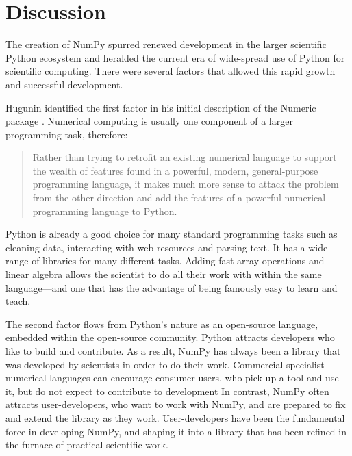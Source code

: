 \section*{Discussion}



The creation of NumPy spurred renewed development in the larger scientific
Python ecosystem and heralded the current era of wide-spread use of Python for
scientific computing.
There were several factors that allowed this rapid growth
and successful development.

Hugunin identified the first factor in his initial description of the Numeric
package \cite{Hugunin-whitepaper}.  Numerical computing is usually one
component of a larger programming task, therefore:
\begin{quote}
    Rather than trying to retrofit an existing numerical language to support
    the wealth of features found in a powerful, modern, general-purpose
    programming language, it makes much more sense to attack the problem from
    the other direction and add the features of a powerful numerical
    programming language to Python.
\end{quote}
Python is already a good choice for many standard programming tasks such as
cleaning data, interacting with web resources and parsing text.  It has a wide
range of libraries for many different tasks. Adding fast array operations and
linear algebra allows the scientist to do all their work with within the same
language---and one that has the advantage of being famously easy to learn and
teach.

The second factor flows from Python's nature as an open-source language,
embedded within the open-source community.  Python attracts developers who like
to build and contribute.  As a result, NumPy has always been a library that was
developed by scientists in order to do their work.  Commercial specialist
numerical languages can encourage consumer-users, who pick up a tool and use
it, but do not expect to contribute to development%
In contrast, NumPy often
attracts user-developers, who want to work with NumPy, and are prepared to fix
and extend the library as they work. User-developers have been the fundamental
force in developing NumPy, and shaping it into a library that has been refined
in the furnace of practical scientific work.

